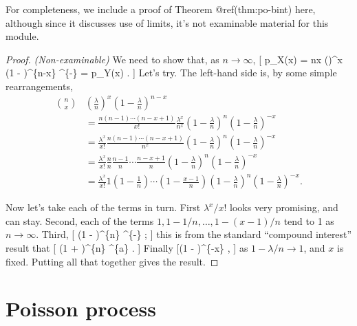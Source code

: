 \documentclass[
  letterpaper,
]{report}
\theoremstyle{definition}
\theoremstyle{definition}
\theoremstyle{remark}
\begin{document}
For completeness, we include a proof of Theorem @ref(thm:po-bint) here,
although since it discusses use of limits, it's not examinable material
for this module.

\begin{proof}

\emph{(Non-examinable)} We need to show that, as \(n \to \infty\), {[}
p\_X(x) = \binom nx \left(\right)\^{}x \left(1 -
\right)\^{}\{n-x\} \to {}\^{}\{-\lambda\}
 = p\_Y(x) . {]} Let's try. The left-hand side is,
by some simple rearrangements, \begin{align*}
\binom nx &\left(\frac{\lambda}{n}\right)^x \left(1 - \frac{\lambda}{n}\right)^{n-x} \\
  &= \frac{n(n-1)\cdots(n-x+1)}{x!} \frac{\lambda^x}{n^x} \left(1 - \frac{\lambda}{n}\right)^{n}\left(1 - \frac{\lambda}{n}\right)^{-x} \\
  &= \frac{\lambda^x}{x!} \frac{n(n-1)\cdots(n-x+1)}{n^x} \left(1 - \frac{\lambda}{n}\right)^{n}\left(1 - \frac{\lambda}{n}\right)^{-x} \\
  &= \frac{\lambda^x}{x!} \frac{n}{n} \frac{n-1}{n} \cdots \frac{n-x+1}{n} \left(1 - \frac{\lambda}{n}\right)^{n}\left(1 - \frac{\lambda}{n}\right)^{-x} \\
  &= \frac{\lambda^x}{x!} 1 \left(1 - \frac{1}{n}\right) \cdots \left(1 - \frac{x-1}{n}\right)  \left(1 - \frac{\lambda}{n}\right)^{n}\left(1 - \frac{\lambda}{n}\right)^{-x} .
\end{align*}

Now let's take each of the terms in turn. First \(\lambda^x / x!\) looks
very promising, and can stay. Second, each of the terms
\(1, 1 - 1/n, \dots, 1 - (x-1)/n\) tend to 1 as \(n \to \infty\). Third,
{[} \left(1 - \right)\^{}\{n\}
\to {}\^{}\{-\lambda\} ; {]} this is from the standard
``compound interest'' result that {[} \left(1 +
\right)\^{}\{n\} \to {}\^{}\{a\}
\qquad {}. {]} Finally {[}\left(1 -
\right)\^{}\{-x\}  , {]} as
\(1 - \lambda/n \to 1\), and \(x\) is fixed. Putting all that together
gives the result.

\end{proof}

\hypertarget{poisson-process}{%
\section{Poisson process}\label{poisson-process}}
\end{document}
